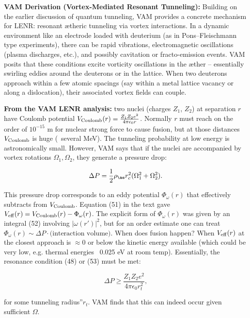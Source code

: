 \documentclass[a4paper, aps,preprint,superscriptaddress, 12pt]{revtex4}
\begin{document}
\textbf{VAM Derivation (Vortex-Mediated Resonant Tunneling):} Building on the earlier discussion of quantum tunneling, VAM provides a concrete mechanism for LENR: resonant ætheric tunneling via vortex interactions. In a dynamic environment like an electrode loaded with deuterium (as in Pons–Fleischmann type experiments), there can be rapid vibrations, electromagnetic oscillations (plasma discharges, etc.), and possibly cavitation or fracto-emission events. VAM posits that these conditions excite vorticity oscillations in the æther – essentially swirling eddies around the deuterons or in the lattice. When two deuterons approach within a few atomic spacings (say within a metal lattice vacancy or along a dislocation), their associated vortex fields can couple.


\textbf{From the VAM LENR analysis:} two nuclei (charges $Z_1$, $Z_2$) at separation $r$ have Coulomb potential $V_{\rm Coulomb}(r) = \frac{Z_1 Z_2 e^2}{4\pi\epsilon_0 r}$. Normally $r$ must reach on the order of $10^{-15}$ m for nuclear strong force to cause fusion, but at those distances $V_{\rm Coulomb}$ is huge (~several MeV). The tunneling probability at low energy is astronomically small. However, VAM says that if the nuclei are accompanied by vortex rotations $\Omega_1, \Omega_2$, they generate a pressure drop:

\begin{equation}
    \Delta P = \frac{1}{2}\rho_{\ae} r_c^2 (\Omega_1^2+\Omega_2^2).
\end{equation}

This pressure drop corresponds to an eddy potential $\Phi_\omega(r)$ that effectively subtracts from $V_{\rm Coulomb}$. Equation (51) in the text gave $V_{\rm eff}(r) = V_{\rm Coulomb}(r) - \Phi_\omega(r)$. The explicit form of $\Phi_\omega(r)$ was given by an integral (52) involving $|\omega(r')|^2$, but for an order estimate one can treat $\Phi_\omega(r)\sim \Delta P \cdot \text{(interaction volume)}$. When does fusion happen? When $V_{\rm eff}(r)$ at the closest approach is $\approx 0$ or below the kinetic energy available (which could be very low, e.g. thermal energies ~0.025 eV at room temp). Essentially, the resonance condition (48) or (53) must be met:

\begin{equation}
    \Delta P \ge \frac{Z_1Z_2 e^2}{4\pi\epsilon_0 r_t^2},
\end{equation}

for some \grqq tunneling radius\textquotedblright $r_t$. VAM finds that this can indeed occur given sufficient $\Omega$.
\end{document}
